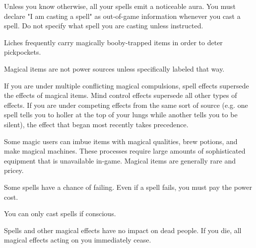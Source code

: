 \documentclass[green]{Sel}
\begin{document}
\name{\gMagic{}}
Unless you know otherwise, all your spells emit a noticeable aura. You must declare "I am casting a spell" as out-of-game information whenever you cast a spell. Do not specify what spell you are casting unless instructed.

Liches frequently carry magically booby-trapped items in order to deter pickpockets.

Magical items are not power sources unless specifically labeled that way.

If you are under multiple conflicting magical compulsions, spell effects supersede the effects of magical items. Mind control effects supersede all other types of effects. If you are under competing effects from the same sort of source (e.g. one spell tells you to holler at the top of your lungs while another tells you to be silent), the effect that began most recently takes precedence.

Some magic users can imbue items with magical qualities, brew potions, and make magical machines. These processes require large amounts of sophisticated equipment that is unavailable in-game. Magical items are generally rare and pricey.

Some spells have a chance of failing. Even if a spell fails, you must pay the power cost.

You can only cast spells if conscious.

Spells and other magical effects have no impact on dead people. If you die, all magical effects acting on you immediately cease.
\end{document}

